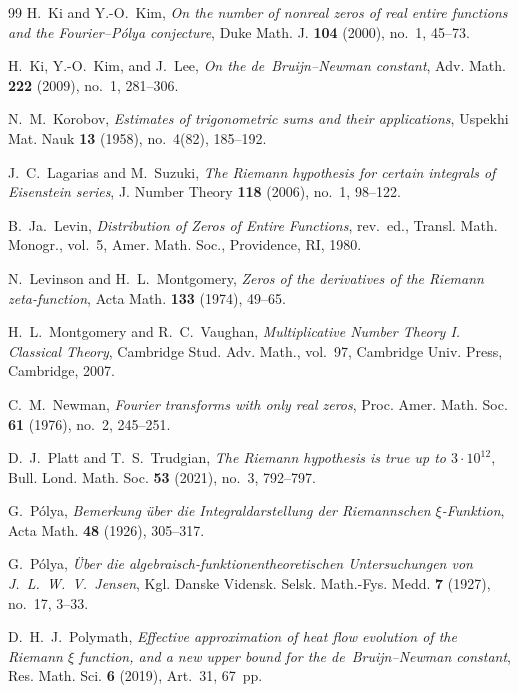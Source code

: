 \documentclass[11pt,a4paper,reqno]{amsart}
\theoremstyle{definition}
\theoremstyle{remark}
\numberwithin{equation}{section}
\begin{document}
\begin{thebibliography}{99}
H.~Ki and Y.-O.~Kim, \emph{On the number of nonreal zeros of real entire functions and the Fourier--P\'olya conjecture}, Duke Math. J. \textbf{104} (2000), no.~1, 45--73.

H.~Ki, Y.-O.~Kim, and J.~Lee, \emph{On the de~Bruijn--Newman constant}, Adv. Math. \textbf{222} (2009), no.~1, 281--306.

N.~M.~Korobov, \emph{Estimates of trigonometric sums and their applications}, Uspekhi Mat. Nauk \textbf{13} (1958), no.~4(82), 185--192.

J.~C.~Lagarias and M.~Suzuki, \emph{The Riemann hypothesis for certain integrals of Eisenstein series}, J. Number Theory \textbf{118} (2006), no.~1, 98--122.

B.~Ja.~Levin, \emph{Distribution of Zeros of Entire Functions}, rev.\ ed., Transl. Math. Monogr., vol.~5, Amer. Math. Soc., Providence, RI, 1980.

N.~Levinson and H.~L.~Montgomery, \emph{Zeros of the derivatives of the Riemann zeta-function}, Acta Math. \textbf{133} (1974), 49--65.

H.~L.~Montgomery and R.~C.~Vaughan, \emph{Multiplicative Number Theory I. Classical Theory}, Cambridge Stud. Adv. Math., vol.~97, Cambridge Univ. Press, Cambridge, 2007.

C.~M.~Newman, \emph{Fourier transforms with only real zeros}, Proc. Amer. Math. Soc. \textbf{61} (1976), no.~2, 245--251.

D.~J.~Platt and T.~S.~Trudgian, \emph{The Riemann hypothesis is true up to $3\cdot 10^{12}$}, Bull. Lond. Math. Soc. \textbf{53} (2021), no.~3, 792--797.

G.~P\'olya, \emph{Bemerkung \"uber die Integraldarstellung der Riemannschen $\xi$-Funktion}, Acta Math. \textbf{48} (1926), 305--317.

G.~P\'olya, \emph{\"Uber die algebraisch-funktionentheoretischen Untersuchungen von J.~L.~W.~V.~Jensen}, Kgl. Danske Vidensk. Selsk. Math.-Fys. Medd. \textbf{7} (1927), no.~17, 3--33.

D.~H.~J.~Polymath, \emph{Effective approximation of heat flow evolution of the Riemann $\xi$ function, and a new upper bound for the de~Bruijn--Newman constant}, Res. Math. Sci. \textbf{6} (2019), Art.~31, 67~pp.


\end{thebibliography}
\end{document}
